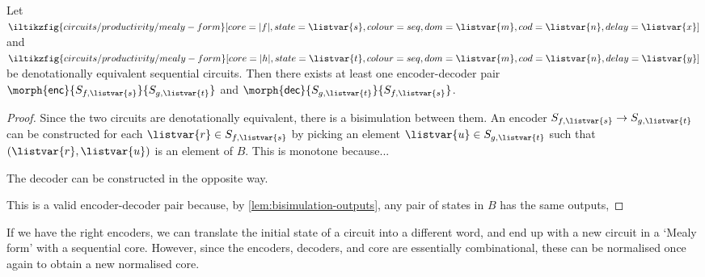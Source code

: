 \begin{theorem}\label{thm:posssible-encodings}
    Let \(
    \iltikzfig{circuits/productivity/mealy-form}[core=|f|,state=\listvar{s},colour=seq,dom=\listvar{m},cod=\listvar{n},delay=\listvar{x}]
    \) and \(
    \iltikzfig{circuits/productivity/mealy-form}[core=|h|,state=\listvar{t},colour=seq,dom=\listvar{m},cod=\listvar{n},delay=\listvar{y}]
    \) be denotationally equivalent sequential circuits.
    Then there exists at least one encoder-decoder pair \(
    \morph{\mathsf{enc}}{S_{f,\listvar{s}}}{S_{g,\listvar{t}}}
    \) and \(
    \morph{\mathsf{dec}}{S_{g,\listvar{t}}}{S_{f,\listvar{s}}}
    \).
\end{theorem}
\begin{proof}
    Since the two circuits are denotationally equivalent, there is a
    bisimulation between them.
    An encoder \(S_{f,\listvar{s}} \to S_{g,\listvar{t}}\) can be constructed
    for each \(\listvar{r} \in S_{f,\listvar{s}}\) by picking an element
    \(\listvar{u} \in S_{g,\listvar{t}}\) such that
    \((\listvar{r}, \listvar{u})\) is an element of \(B\).
    This is monotone because...

    The decoder can be constructed in the opposite way.

    This is a valid encoder-decoder pair because, by
    \cref{lem:bisimulation-outputs}, any pair of states in \(B\) has the same
    outputs,
\end{proof}

If we have the right encoders, we can translate the initial state of a circuit
into a different word, and end up with a new circuit in a `Mealy form' with a
sequential core.
However, since the encoders, decoders, and core are essentially combinational,
these can be normalised once again to obtain a new normalised core.
